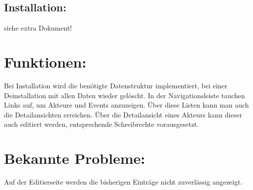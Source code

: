 \documentclass{swp}
\begin{document}
\subsection{Installation:}
siehe extra Dokument!
\section{Funktionen:}
Bei Installation wird die ben\"otigte Datenstruktur implementiert, bei einer Deinstallation mit allen Daten wieder gel\"oscht. In der Navigationsleiste tauchen Links auf, um Akteure und Events anzuzeigen. \"Uber diese Listen kann man auch die Detailansichten erreichen. \"Uber die Detailansicht eines Akteurs kann dieser auch editiert werden, entsprechende Schreibrechte vorausgesetzt.
\section{Bekannte Probleme:}
Auf der Editierseite werden die bisherigen Eintr\"age nicht zuverl\"assig angezeigt.
\end{document}
